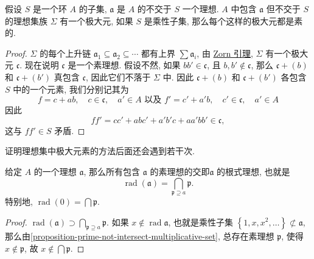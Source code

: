 \begin{proposition}
  \label{proposition-prime-not-intersect-multiplicative-set}
  假设 \( S \) 是一个环 \( A \) 的子集, \( \mathfrak{a} \) 是 \( A \) 的不交于
  \( S \) 一个理想.  \( A \) 中包含 \( \mathfrak{a} \) 但不交于 \( S \)
  的理想集族 \( \Sigma \) 有一个极大元, 如果 \( S \) 是乘性子集,
  那么每个这样的极大元都是素的.
\end{proposition}
\begin{proof}
  \( \Sigma \) 的每个上升链 \( \mathfrak{a}_1 \subseteq \mathfrak{a}_2 \subseteq
  \cdots \) 都有上界 \( \sum \mathfrak{a}_i \), 由
  \href{https://en.wikipedia.org/wiki/Zorn%27s_lemma}{Zorn 引理}, \( \Sigma \)
  有一个极大元 \( \mathfrak{c} \).
  现在说明 \( \mathfrak{c} \) 是一个素理想.
  假设不然, 如果 \( b b' \in \mathfrak{c} \), 且 \( b, b' \notin \mathfrak{c}
  \), 那么 \( \mathfrak{c} + (b) \) 和 \( \mathfrak{c} + (b') \) 真包含 \(
  \mathfrak{c} \), 因此它们不落于 \( \Sigma \) 中.
  因此 \( \mathfrak{c} + (b) \) 和 \( \mathfrak{c} + (b') \) 各包含 \( S \)
  中的一个元素, 我们分别记其为
  \[
    f = c + ab,\quad c \in \mathfrak{c},\quad a' \in A \text{ 以及 } f' = c' +
    a'b,\quad c' \in \mathfrak{c},\quad a' \in A
  \]
  因此
  \[
    f f' = c c' + abc' + a'b'c + aa'bb' \in \mathfrak{c},
  \]
  这与 \( f f' \in S \) 矛盾.
\end{proof}
\begin{remark}
  证明理想集中极大元素的方法后面还会遇到若干次.
\end{remark}

\begin{proposition}
  \label{proposition-radical-as-prime-intersection}
  给定 \( A \) 的一个理想 \( \mathfrak{a} \), 那么所有包含 \( \mathfrak{a} \)
  的素理想的交即\( \mathfrak{a} \) 的根式理想, 也就是
  \[
    \operatorname{rad}(\mathfrak{a}) = \bigcap_{\mathfrak{p}\supseteq a}
    \mathfrak{p}.
  \]
  特别地, \( \operatorname{rad}(0) = \bigcap \mathfrak{p} \).
\end{proposition}
\begin{proof}
  \( \operatorname{rad}(\mathfrak{a}) \supset \bigcap_{\mathfrak{p}\supseteq a}
  \mathfrak{p} \).
  如果 \( x \notin \operatorname{rad} \mathfrak{a} \), 也就是乘性子集 \(
  \left\lbrace 1, x, x^2, \ldots \right\rbrace \not\subset \mathfrak{a} \),
  那么由\cref{proposition-prime-not-intersect-multiplicative-set}, 总存在素理想
  \(  \mathfrak{p} \), 使得 \( x \notin \mathfrak{p} \), 故 \( x \notin \bigcap
  \mathfrak{p} \).
\end{proof}

